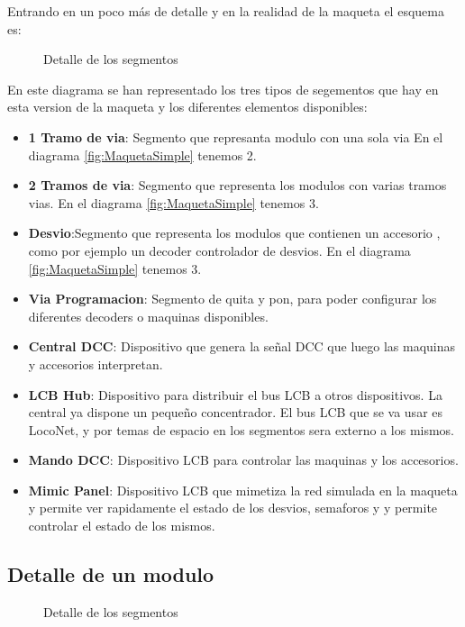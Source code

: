 
Entrando en un poco más de detalle y en la realidad de la maqueta
el esquema es:

\begin{figure}[H]
    \centering
    
    \caption{Detalle de los segmentos}
    \label{fig:SegmentosDetail}
\end{figure}
En este diagrama se han representado los tres tipos de segementos que hay
en esta version de la maqueta y los diferentes elementos disponibles:
\begin{itemize}
    \item \textbf{1 Tramo de via}: Segmento que represanta modulo con una sola via
En el diagrama \ref{fig:MaquetaSimple} tenemos 2.
    \item \textbf{2 Tramos de via}: Segmento que representa los modulos con varias
tramos vias. En el diagrama \ref{fig:MaquetaSimple} tenemos 3.
    \item \textbf{Desvio}:Segmento que representa los modulos que contienen un accesorio
, como por ejemplo un decoder controlador de desvios. En el diagrama \ref{fig:MaquetaSimple} tenemos 3.
    \item \textbf{Via Programacion}: Segmento de quita y pon, para poder
configurar los diferentes decoders o maquinas disponibles.
    \item \textbf{Central DCC}: Dispositivo que genera la señal DCC
que luego las maquinas y accesorios interpretan.
    \item \textbf{LCB Hub}: Dispositivo para distribuir el bus 
LCB a otros dispositivos. La central ya dispone un pequeño concentrador.
El bus LCB que se va usar es LocoNet, y por temas de espacio en los segmentos
sera externo a los mismos.
    \item \textbf{Mando DCC}: Dispositivo LCB para controlar las maquinas
y los accesorios.
    \item \textbf{Mimic Panel}: Dispositivo LCB que mimetiza la red simulada
en la maqueta y permite ver rapidamente el estado de los desvios, semaforos y
y permite controlar el estado de los mismos.
\end{itemize}

\subsection{Detalle de un modulo}
\begin{figure}[H]
    \centering
    
    \caption{Detalle de los segmentos}
    \label{fig:ModuloDetail}
\end{figure}